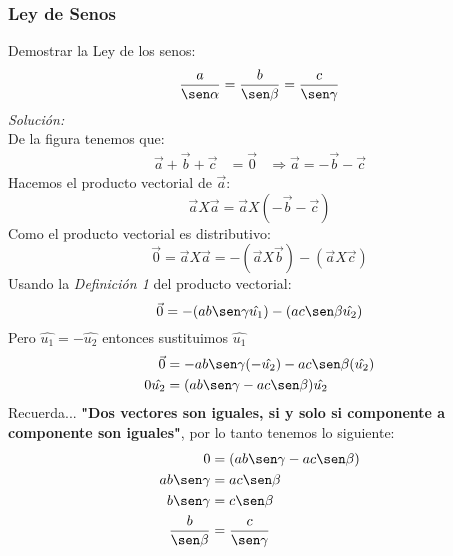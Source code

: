\documentclass[12pt,openany]{book}
\begin{document}
			\subsubsection{Ley de Senos}
				 Demostrar la Ley de los senos:
				 $$
				 	\frac{a}{\sen\alpha}=\frac{b}{\sen\beta}=\frac{c}{\sen\gamma}
				 $$
				 \noindent\textsl{Soluci\'on:}\\
				 De la figura tenemos que:
				 \begin{equation*}
				 	\begin{split}
				 		\vec{a}+\vec{b}+\vec{c}&=\vec{0} 
				 		&\Rightarrow \vec{a}=-\vec{b}-\vec{c} 
				 	\end{split}
				 \end{equation*}
				 Hacemos el producto vectorial de $\vec{a}$:
				 \begin{equation*}
				 		\vec{a}X\vec{a}=\vec{a}X(-\vec{b}-\vec{c})
				 \end{equation*}
				 Como el producto vectorial es distributivo:
				 \begin{equation*}
				 		\vec{0}=\vec{a}X\vec{a}=-(\vec{a}X\vec{b})-(\vec{a}X\vec{c})
				 \end{equation*}
				 Usando la \textsl{Definici\'on 1} del producto vectorial:
				 \begin{equation*}
				 		\vec{0}=-(ab\sen\gamma\hat{u_{1}})-(ac\sen\beta\hat{u_{2}})
				 \end{equation*}
				 Pero $\hat{u_{1}}=-\hat{u_{2}} $ entonces sustituimos $\hat{u_{1}}$
				 \begin{equation*}
				 	\begin{split}
				 		\vec{0}&=-ab\sen\gamma(-\hat{u_{2}})-ac\sen\beta(\hat{u_{2}}) \\
				 		0\hat{u_{2}}&=(ab\sen\gamma-ac\sen\beta)\hat{u_{2}}
				 	\end{split}
				 \end{equation*}
			    Recuerda... \textbf{"Dos vectores son iguales, si y solo si componente a componente son iguales"}, 
	    	    por lo tanto tenemos lo siguiente:
				\begin{equation*}
				 	\begin{split}
				 		0&=(ab\sen\gamma-ac\sen\beta)\\
				 		ab\sen\gamma&=ac\sen\beta \\
				 		b\sen\gamma&=c\sen\beta   \\
				 		\frac{b}{\sen\beta}&=\frac{c}{\sen\gamma}
				 	\end{split}
				 \end{equation*}
\end{document}
